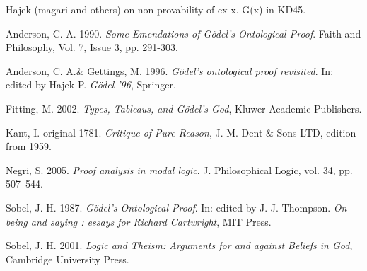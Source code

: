 \documentclass{llncs}
\begin{document}
Hajek (magari and others) on non-provability of ex x. G(x) in KD45.


\begin{thebibliography}{9}

Anderson, C. A. 1990. {\itshape Some Emendations of G\"odel's Ontological Proof}. Faith and Philosophy, Vol. 7, Issue 3, pp. 291-303. 

Anderson, C. A.\& Gettings, M. 1996.  {\itshape G\"odel's ontological proof revisited}. In: edited by Hajek P. {\itshape G\"odel '96},  Springer. 


Fitting, M. 2002.  {\itshape Types, Tableaus, and G\"odel's God}, Kluwer Academic Publishers.  

Kant, I.  original 1781.   {\itshape Critique of Pure Reason}, J. M. Dent \& Sons LTD, edition from 1959.

Negri, S. 2005. {\itshape Proof analysis in modal logic}. J. Philosophical Logic, vol. 34, pp. 507--544. 

Sobel, J. H. 1987. {\itshape G\"odel's Ontological Proof}. In: edited by J. J. Thompson. {\itshape On being and saying : essays for Richard Cartwright},  MIT Press. 

Sobel, J. H. 2001. {\itshape Logic and Theism: Arguments for and against Beliefs in God}, Cambridge University Press. 



\end{thebibliography}
\end{document}
